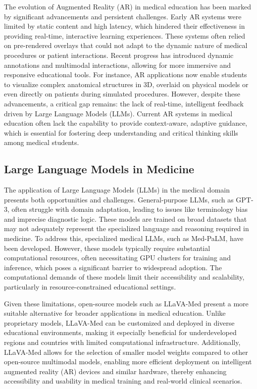 \documentclass[10pt,letterpaper]{article}
\begin{document}
The evolution of Augmented Reality (AR) in medical education has been marked by significant advancements and persistent challenges\cite{bacca2014augmented}. Early AR systems were limited by static content and high latency, which hindered their effectiveness in providing real-time, interactive learning experiences. These systems often relied on pre-rendered overlays that could not adapt to the dynamic nature of medical procedures or patient interactions\cite{akcayir2017advantages}. Recent progress has introduced dynamic annotations and multimodal interactions, allowing for more immersive and responsive educational tools\cite{mayer2020multimedia}. For instance, AR applications now enable students to visualize complex anatomical structures in 3D, overlaid on physical models or even directly on patients during simulated procedures\cite{tang2020augmented}. However, despite these advancements, a critical gap remains: the lack of real-time, intelligent feedback driven by Large Language Models (LLMs). Current AR systems in medical education often lack the capability to provide context-aware, adaptive guidance, which is essential for fostering deep understanding and critical thinking skills among medical students\cite{gordon2024scoping}.

\subsection*{Large Language Models in Medicine}

The application of Large Language Models (LLMs) in the medical domain presents both opportunities and challenges. General-purpose LLMs, such as GPT-3, often struggle with domain adaptation, leading to issues like terminology bias and imprecise diagnostic logic\cite{meng2024application}. These models are trained on broad datasets that may not adequately represent the specialized language and reasoning required in medicine. To address this, specialized medical LLMs, such as Med-PaLM\cite{singhal2023large}, have been developed. However, these models typically require substantial computational resources, often necessitating GPU clusters for training and inference, which poses a significant barrier to widespread adoption\cite{gordon2024scoping}. The computational demands of these models limit their accessibility and scalability, particularly in resource-constrained educational settings\cite{karabacak2023embracing}.

Given these limitations, open-source models such as LLaVA-Med present a more suitable alternative for broader applications in medical education. Unlike proprietary models, LLaVA-Med can be customized and deployed in diverse educational environments, making it especially beneficial for underdeveloped regions and countries with limited computational infrastructure. Additionally, LLaVA-Med allows for the selection of smaller model weights compared to other open-source multimodal models, enabling more efficient deployment on intelligent augmented reality (AR) devices and similar hardware, thereby enhancing accessibility and usability in medical training and real-world clinical scenarios.
\end{document}
